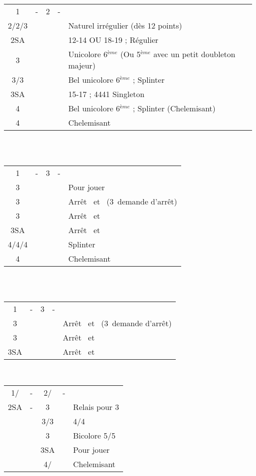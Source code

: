\documentclass[a4paper, oneside, 11pt]{report}
\begin{document}
		\begin{tabular}{cccc|l}
		1\carreau & - & 2\carreau & - &\\
		2\coeur/2\pique/3\trefle &&&& Naturel irrégulier (dès 12 points)\\
		2SA &&&& 12-14 OU 18-19 ; Régulier\\
		3\carreau &&&& Unicolore 6$^{ème}$ (Ou 5$^{ème}$ avec un petit doubleton majeur)\\
		3\coeur/3\pique &&&& Bel unicolore 6$^{ème}$ ; Splinter\\
		3SA &&&& 15-17 ; 4441 Singleton \trefle\\
		4\trefle &&&& Bel unicolore 6$^{ème}$ ; Splinter (Chelemisant)\\
		4\carreau &&&& Chelemisant \carreau\\
		\end{tabular}\\\\
		
		\begin{tabular}{cccc|l}
		1\carreau & - & 3\trefle & - &\\	
		3\carreau &&&& Pour jouer\\
		3\coeur &&&& Arrêt \coeur\ et \carreau\ (3\pique\ demande d'arrêt)\\
		3\pique &&&& Arrêt \pique\ et \carreau\\
		3SA &&&& Arrêt \coeur\ et \pique\\
		4\trefle/4\coeur/4\pique &&&& Splinter\\
		4\carreau &&&& Chelemisant \carreau\\
		\end{tabular}\\\\
	
		\begin{tabular}{cccc|l}
		1\carreau & - & 3\carreau & - &\\
		3\coeur &&&& Arrêt \coeur\ et \trefle\ (3\pique\ demande d'arrêt)\\
		3\pique &&&& Arrêt \pique\ et \trefle\\
		3SA &&&& Arrêt \coeur\ et \pique\\
		\end{tabular}\\

		\begin{tabular}{cccc|l}
		1\trefle/\carreau & - & 2\trefle/\carreau & - &\\
		2SA & - & 3\trefle && Relais pour 3\carreau\\
		&& 3\carreau/3\coeur && 4\coeur/4\pique\\
		&& 3\pique && Bicolore 5\trefle/5\carreau\\
		&& 3SA && Pour jouer\\
		&& 4\trefle/\carreau && Chelemisant\\
		\end{tabular}\\\\
\end{document}

